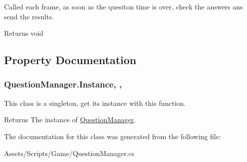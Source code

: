 Called each frame, as soon as the quesiton time is over, check the answers ans send the results.

\begin{DoxyReturn}{Returns}
void
\end{DoxyReturn}


\subsection{Property Documentation}
\hypertarget{class_question_manager_a96dda0e2445bf92325df364298864be9}{
\subsubsection[{Instance}]{ Question\-Manager.\-Instance\hspace{0.3cm}{\ttfamily [static]}, {\ttfamily [get]}, {\ttfamily [set]}}}\label{class_question_manager_a96dda0e2445bf92325df364298864be9}


This class is a singleton, get its instance with this function.

\begin{DoxyReturn}{Returns}
The instance of \hyperlink{class_question_manager}{Question\-Manager}.
\end{DoxyReturn}


The documentation for this class was generated from the following file\-:\begin{DoxyCompactItemize}
\item 
Assets/\-Scripts/\-Game/Question\-Manager.\-cs\end{DoxyCompactItemize}
